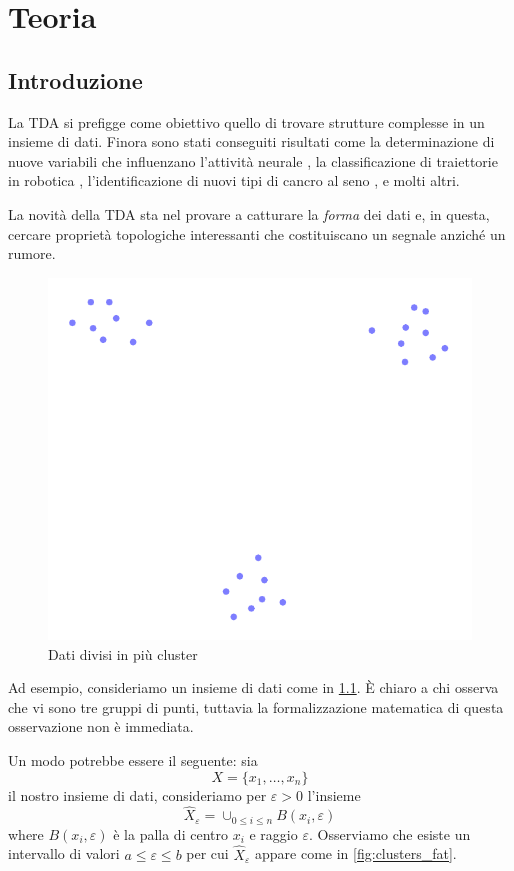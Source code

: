 \chapter{Teoria}\label{ch:teoria}
\section{Introduzione}

La TDA si prefigge come obiettivo quello di trovare strutture complesse in un insieme di dati. Finora sono stati conseguiti risultati come la determinazione di nuove variabili che influenzano l'attività neurale \cite{Spreemann2015}, la classificazione di traiettorie in robotica \cite{Pokorny2014}, l'identificazione di nuovi tipi di cancro al seno \cite{Lum2013}, e molti altri.

La novità della TDA sta nel provare a catturare la \emph{forma} dei dati e, in questa, cercare proprietà topologiche interessanti che costituiscano un segnale anziché un rumore.

\begin{figure}
  \begin{center}
    \includegraphics[width=.4\linewidth]{gfx/three_clusters_small.pdf}
    \caption{Dati divisi in più cluster}
    \label{fig:clusters}
  \end{center}
\end{figure}

Ad esempio, consideriamo un insieme di dati come in \cref{fig:clusters}. È chiaro a chi osserva che vi sono tre gruppi di punti, tuttavia la formalizzazione matematica di questa osservazione non è immediata.

Un modo potrebbe essere il seguente: sia
\begin{equation*}
  X=\{x_1,\dots, x_n\}
\end{equation*}
il nostro insieme di dati, consideriamo per $\varepsilon>0$ l'insieme
\begin{equation*}
  \hat{X}_\varepsilon=\cup_{0\leq i\leq n} B(x_i,\varepsilon)
\end{equation*}
where $B(x_i,\varepsilon)$ è la palla di centro $x_i$ e raggio $\varepsilon$. Osserviamo che esiste un intervallo di valori $a \leq \varepsilon \leq b$ per cui $\hat{X}_\varepsilon$ appare come in \cref{fig:clusters_fat}.

